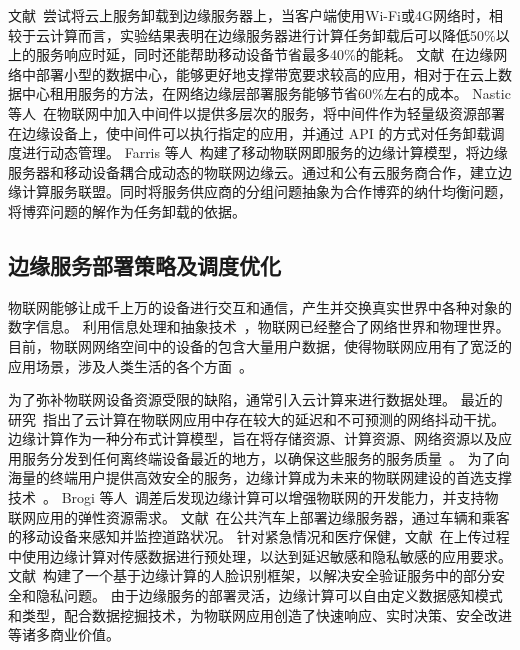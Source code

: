 文献~尝试将云上服务卸载到边缘服务器上，当客户端使用Wi-Fi或4G网络时，相较于云计算而言，实验结果表明在边缘服务器进行计算任务卸载后可以降低50\%以上的服务响应时延，同时还能帮助移动设备节省最多40\%的能耗。
文献~在边缘网络中部署小型的数据中心，能够更好地支撑带宽要求较高的应用，相对于在云上数据中心租用服务的方法，在网络边缘层部署服务能够节省60\%左右的成本。
Nastic等人~\cite{DBLP:conf/edge/NasticTD16}在物联网中加入中间件以提供多层次的服务，将中间件作为轻量级资源部署在边缘设备上，使中间件可以执行指定的应用，并通过 API 的方式对任务卸载调度进行动态管理。
Farris 等人~\cite{DBLP:journals/fgcs/FarrisMNAI17}构建了移动物联网即服务的边缘计算模型，将边缘服务器和移动设备耦合成动态的物联网边缘云。通过和公有云服务商合作，建立边缘计算服务联盟。同时将服务供应商的分组问题抽象为合作博弈的纳什均衡问题，将博弈问题的解作为任务卸载的依据。

\subsection{边缘服务部署策略及调度优化}

物联网能够让成千上万的设备进行交互和通信，产生并交换真实世界中各种对象的数字信息。
利用信息处理和抽象技术~\cite{DBLP:journals/iotj/GanzPBC15}，物联网已经整合了网络世界和物理世界。
目前，物联网网络空间中的设备的包含大量用户数据，使得物联网应用有了宽泛的应用场景，涉及人类生活的各个方面~\cite{DBLP:journals/cm/WangYXJD17}。

为了弥补物联网设备资源受限的缺陷，通常引入云计算来进行数据处理。
最近的研究~\cite{DBLP:journals/iotj/RazzaqueMPC16}指出了云计算在物联网应用中存在较大的延迟和不可预测的网络抖动干扰。
边缘计算作为一种分布式计算模型，旨在将存储资源、计算资源、网络资源以及应用服务分发到任何离终端设备最近的地方，以确保这些服务的服务质量~\cite{AI201877}。
为了向海量的终端用户提供高效安全的服务，边缘计算成为未来的物联网建设的首选支撑技术~\cite{DBLP:journals/iotj/LinYZYZZ17}。
Brogi 等人~\cite{DBLP:Journals/IOTj/BroGif17}调差后发现边缘计算可以增强物联网的开发能力，并支持物联网应用的弹性资源需求。
文献~在公共汽车上部署边缘服务器，通过车辆和乘客的移动设备来感知并监控道路状况。
针对紧急情况和医疗保健，文献~在上传过程中使用边缘计算对传感数据进行预处理，以达到延迟敏感和隐私敏感的应用要求。
文献~构建了一个基于边缘计算的人脸识别框架，以解决安全验证服务中的部分安全和隐私问题。
由于边缘服务的部署灵活，边缘计算可以自由定义数据感知模式和类型，配合数据挖掘技术，为物联网应用创造了快速响应、实时决策、安全改进等诸多商业价值。

